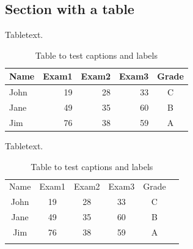 \documentclass[a4paper]{article}
\begin{document}
\subsection{Section with a table}

Tabletext. 
\\
\begin{table}[h!]
\centering
\begin{tabular}{| l || r | r | r | c |}  
\hline
Name&Exam1&Exam2&Exam3&Grade\\
\hline\hline
John&19& 28&33&C \\  
\hline
Jane&49& 35&60&B  \\
\hline
Jim&76& 38&59&A  \\
\hline
\end{tabular}
\caption{Table to test captions and labels}
\label{table:data1}
\end{table}

Tabletext. 
\\
\begin{table}[h!]
\centering
\begin{tabular}{:c:c:c:c:c:c}  
\hdashline
Name&Exam1&Exam2&Exam3&Grade\\
\hdashline\hdashline
John&19& 28&33&C \\  
\hdashline
Jane&49& 35&60&B  \\
\hdashline
Jim&76& 38&59&A  \\
\hdashline
\end{tabular}
\caption{Table to test captions and labels}
\label{table:data2}
\end{table}
\end{document}
